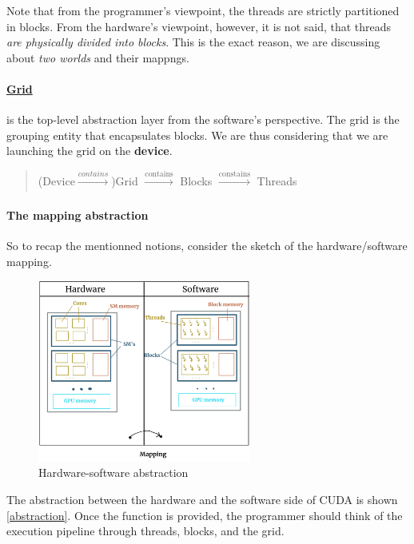Note that from the programmer's viewpoint, the threads are strictly partitioned in blocks. 
From the hardware's viewpoint, however, it is not said, that threads \textit{are physically divided into blocks}. 
This is the exact reason, we are discussing about \textit{two worlds} and their mappngs.

\vspace{-15pt}
\paragraph{\underline{Grid}} is the top-level abstraction layer from the software's perspective. The grid
is the grouping entity that encapsulates blocks. We are thus considering that we are launching 
the grid on the \textbf{device}.
\begin{quote}
   \centering
    (Device$\xrightarrow[]{contains}$)Grid $\xrightarrow[]{\text{contains}}$ Blocks $\xrightarrow[]{\text{constains}}$ Threads
\end{quote}

\vspace{-18pt}
\paragraph{The mapping abstraction} So to recap the mentionned notions, consider the 
sketch of the hardware/software mapping.

\begin{figure}
      \vspace{-10pt}
      \centering
       \includegraphics[height=6cm]{pngs/hard_soft.png}
   \caption{Hardware-software abstraction}
   \label{abstraction}
\end{figure}
The abstraction between the hardware and the software side of CUDA is shown \autoref{abstraction}. Once the function 
is provided, the programmer should think of the execution pipeline through threads, blocks, and the grid.

